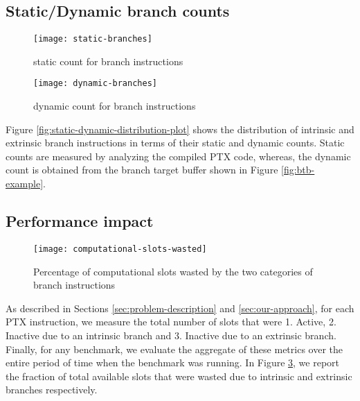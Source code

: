 %
%
\label{sec:results}
\subsection{Static/Dynamic branch counts}
\begin{figure*}
	\hspace{-1.5cm}
	\centering
	\begin{subfigure}{0.45\textwidth}
		\texttt{[image: static-branches]}
		\caption{static count for branch instructions
			\label{fig:static-branches}}
	\end{subfigure}
	\begin{subfigure}{0.45\textwidth}
		\texttt{[image: dynamic-branches]}
		\caption{dynamic count for branch instructions
			\label{fig:dynamic-branches}}
	\end{subfigure}
	\caption{Distribution of the number of branches encountered in different benchmarks
		\label{fig:static-dynamic-distribution-plot}}
\end{figure*}
	Figure \ref{fig:static-dynamic-distribution-plot} shows the distribution of intrinsic and extrinsic branch instructions in terms of their static and dynamic counts. Static counts are measured by analyzing the compiled PTX code, whereas, the dynamic count is obtained from the branch target buffer shown in Figure \ref{fig:btb-example}.

\subsection{Performance impact}
\begin{figure}
	\centering
	\texttt{[image: computational-slots-wasted]}
	\caption{Percentage of computational slots wasted by the two categories of branch instructions
		\label{fig:computational-slots-wasted}}
\end{figure}
As described in Sections \ref{sec:problem-description} and \ref{sec:our-approach}, for each PTX instruction, we measure the total number of slots that were 1. Active, 2. Inactive due to an intrinsic branch and 3. Inactive due to an extrinsic branch. Finally, for any benchmark, we evaluate the aggregate of these metrics over the entire period of time when the benchmark was running. In Figure \ref{fig:computational-slots-wasted}, we report the fraction of total available slots that were wasted due to intrinsic and extrinsic branches respectively.

